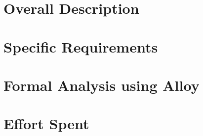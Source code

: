 \documentclass{article}
\begin{document}
\newpage
\section{Overall Description}


\newpage
\section{Specific Requirements}


\newpage
\section{Formal Analysis using Alloy}



\section{Effort Spent}
\end{document}
